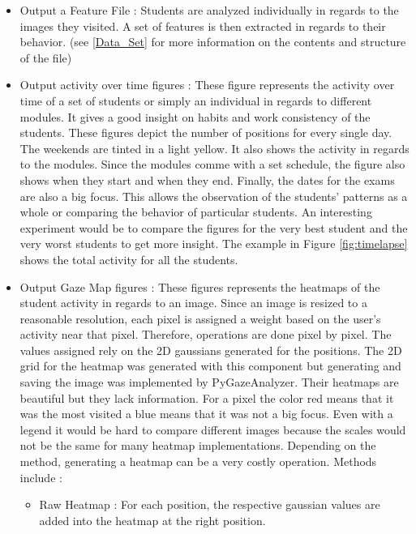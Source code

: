 \documentclass[a4paper,11pt]{report}
\numberwithin{figure}{section} %
\begin{document}
    \begin{itemize}
        \item[\textbullet] Output a Feature File : Students are analyzed individually in regards to the images they visited.
        A set of features is then extracted in regards to their behavior.
        (see \ref{Data_Set} for more information on the contents and structure of the file)
        \item[\textbullet] Output activity over time figures : These figure represents the activity over time of a set of students or simply an individual in regards to different modules.
        It gives a good insight on habits and work consistency of the students.
        These figures depict the number of positions for every single day.
        The weekends are tinted in a light yellow.
        It also shows the activity in regards to the modules.
        Since the modules comme with a set schedule, the figure also shows when they start and when they end.
        Finally, the dates for the exams are also a big focus.
        This allows the observation of the students' patterns as a whole or comparing the behavior of particular students.
        An interesting experiment would be to compare the figures for the very best student and the very worst students to get more insight.
        The example in Figure \ref{fig:timelapse} shows the total activity for all the students.
        \item[\textbullet] Output Gaze Map figures : These figures represents the heatmaps of the student activity in regards to an image.
        Since an image is resized to a reasonable resolution, each pixel is assigned a weight based on the user's activity near that pixel.
        Therefore, operations are done pixel by pixel.
        The values assigned rely on the 2D gaussians generated for the positions.
        The 2D grid for the heatmap was generated with this component but generating and saving the image was implemented by PyGazeAnalyzer.
        Their heatmaps are beautiful but they lack information. For a pixel the color red means that it was the most visited a blue means that it was not a big focus.
        Even with a legend it would be hard to compare different images because the scales would not be the same for many heatmap implementations.
        Depending on the method, generating a heatmap can be a very costly operation.
        Methods include :
        \begin{itemize}
            \item Raw Heatmap : For each position, the respective gaussian values are added into the heatmap at the right position.

\end{itemize}
\end{itemize}
\end{document}
